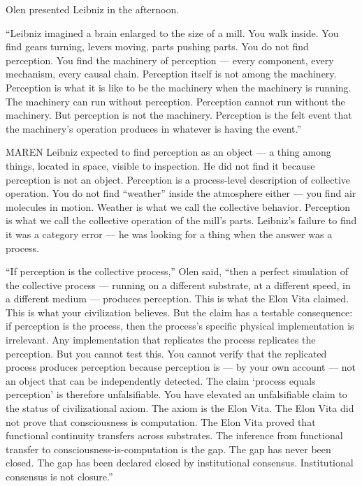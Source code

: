 \quietbreak

Olen presented Leibniz in the afternoon.

\enquote{Leibniz imagined a brain enlarged to the size of a mill. You walk inside. You find gears turning, levers moving, parts pushing parts. You do not find perception. You find the machinery of perception — every component, every mechanism, every causal chain. Perception itself is not among the machinery. Perception is what it is like to be the machinery when the machinery is running. The machinery can run without perception. Perception cannot run without the machinery. But perception is not the machinery. Perception is the felt event that the machinery's operation produces in whatever is having the event.}

\begin{tribunal}{MAREN}
Leibniz expected to find perception as an object — a thing among things, located in space, visible to inspection. He did not find it because perception is not an object. Perception is a process-level description of collective operation. You do not find \enquote{weather} inside the atmosphere either — you find air molecules in motion. Weather is what we call the collective behavior. Perception is what we call the collective operation of the mill's parts. Leibniz's failure to find it was a category error — he was looking for a thing when the answer was a process.
\end{tribunal}

\enquote{If perception is the collective process,} Olen said, \enquote{then a perfect simulation of the collective process — running on a different substrate, at a different speed, in a different medium — produces perception. This is what the Elon Vita claimed. This is what your civilization believes. But the claim has a testable consequence: if perception is the process, then the process's specific physical implementation is irrelevant. Any implementation that replicates the process replicates the perception. But you cannot test this. You cannot verify that the replicated process produces perception because perception is — by your own account — not an object that can be independently detected. The claim \enquote*{process equals perception} is therefore unfalsifiable. You have elevated an unfalsifiable claim to the status of civilizational axiom. The axiom is the Elon Vita. The Elon Vita did not prove that consciousness is computation. The Elon Vita proved that functional continuity transfers across substrates. The inference from functional transfer to consciousness-is-computation is the gap. The gap has never been closed. The gap has been declared closed by institutional consensus. Institutional consensus is not closure.}

